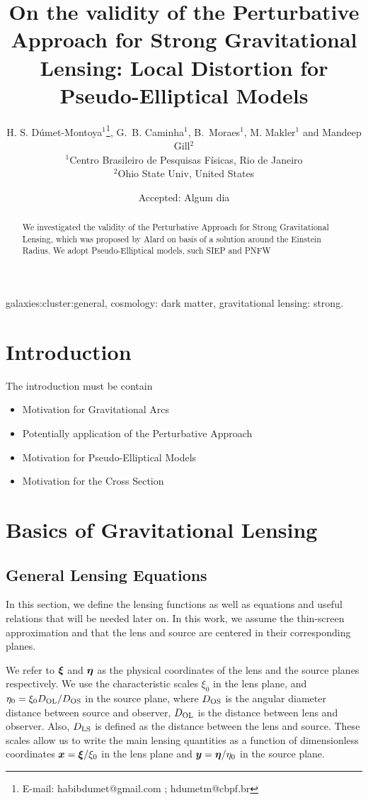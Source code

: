 \documentclass[useAMS,usenatbib]{mn2e}
\title[On the validity of the Perturbative Approach for Strong Gravitational Lensing]{On the validity of the Perturbative Approach for Strong Gravitational Lensing: Local Distortion for Pseudo-Elliptical Models}
\author[H.S.~D\'umet-Montoya et. al.]{H. S. D\'umet-Montoya$^{1}$\thanks{E-mail:
habibdumet@gmail.com ; hdumetm@cbpf.br }, G.~B. Caminha$^{1}$, B.~Moraes$^{1}$, M. Makler$^{1}$ and 
Mandeep Gill$^{2}$\\
$^{1}$Centro Brasileiro de Pesquisas F\'isicas, Rio de Janeiro\\
$^{2}$Ohio State Univ, United States}
\begin{document}
\date{Accepted: Algum dia }

\pagerange{\pageref{firstpage}--\pageref{lastpage}} 

\maketitle

\label{firstpage}

\begin{abstract}
We investigated the validity of the Perturbative Approach for Strong Gravitational Lensing, which was proposed by Alard on
basis of a solution around the Einstein Radius. We adopt Pseudo-Elliptical models, such SIEP and PNFW
\end{abstract}

\begin{keywords}
galaxies:cluster:general, cosmology: dark matter, gravitational lensing: strong.
\end{keywords}

\section{Introduction}

The introduction must be contain
\begin{itemize}
\item Motivation for Gravitational Arcs
\item Potentially application of the Perturbative Approach
\item Motivation for Pseudo-Elliptical Models
\item Motivation for the Cross Section
\end{itemize}

\section{Basics of Gravitational Lensing}

\subsection{General Lensing Equations}

In this section, we define the lensing functions as well as equations and useful relations that will be needed later on.  In this work, we assume the thin-screen approximation and that the lens and source are centered in their corresponding planes.

We refer to $\bmath{\xi}$ and $\bmath{\eta}$ as the physical coordinates of the lens and the source planes respectively. We use the characteristic scales  $\xi_0$ in the lens plane, and $\eta_0= \xi_0 D_{\rm OL}/D_{\rm OS}$ in the source plane, where $D_{\rm OS}$ is the angular diameter distance between source and observer, $D_{\rm OL}$ is the distance between lens and observer. Also, $D_{\rm LS}$ is defined as the distance between the lens and source. These scales allow us to write the main lensing quantities as a function of dimensionless coordinates $\bmath{x}=\bmath{\xi}/\xi_0$ in the lens plane and $ \bmath{y}=\bmath{\eta}/\eta_0$ in the source plane.
\end{document}
